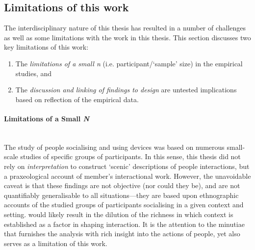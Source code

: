 


\subsection{Limitations of this work}\label{sec:synopsis conclusions reflection limitations}
The interdisciplinary nature of this thesis has resulted in a number of challenges as well as some limitations with the work in this thesis.
This section discusses two key limitations of this work:

\begin{enumerate}
    \item The \textit{limitations of a small n} (i.e. participant/`sample' size) in the empirical studies, and


    \item The \textit{discussion and linking of findings to design} are untested implications based on reflection of the empirical data.
\end{enumerate}

\paragraph{Limitations of a Small \textit{N}} \hfill \\
The study of people socialising and using devices was based on numerous small-scale studies of specific groups of participants.
In this sense, this thesis did not rely on \textit{interpretation} to construct `scenic' descriptions of people interactions, but a praxeological account of member's interactional work.
However, the unavoidable caveat is that these findings are not objective (nor could they be), and are not quantifiably generalisable to all situations---they are based upon ethnographic accounts of the studied groups of participants socialising in a given context and setting.
 would likely result in the dilution of the richness in which context is established as a factor in shaping interaction.
It is the attention to the minutiae that furnishes the analysis with rich insight into the actions of people, yet also serves as a limitation of this work.

